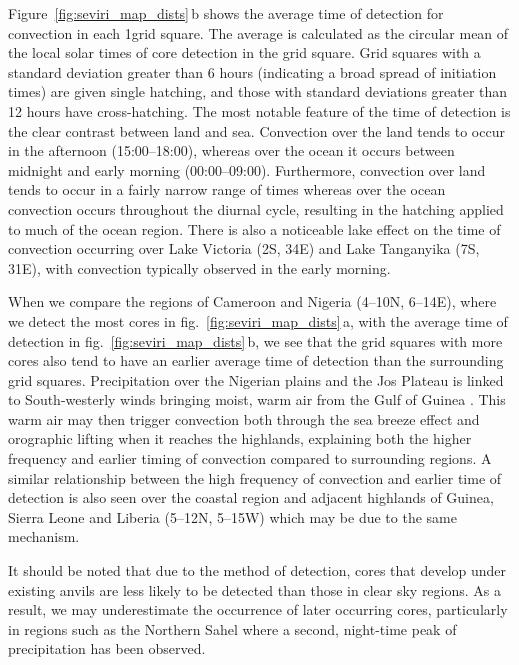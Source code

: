 \documentclass[acp, manuscript]{copernicus}
\begin{document}
Figure~\ref{fig:seviri_map_dists}\,b shows the average time of detection for convection in each 1\textdegree grid square. 
The average is calculated as the circular mean of the local solar times of core detection in the grid square. 
Grid squares with a standard deviation greater than 6 hours (indicating a broad spread of initiation times) are given single hatching, and those with standard deviations greater than 12 hours have cross-hatching. 
The most notable feature of the time of detection is the clear contrast between land and sea. 
Convection over the land tends to occur in the afternoon (15:00--18:00), whereas over the ocean it occurs between midnight and early morning (00:00--09:00). 
Furthermore, convection over land tends to occur in a fairly narrow range of times whereas over the ocean convection occurs throughout the diurnal cycle, resulting in the hatching applied to much of the ocean region. 
There is also a noticeable lake effect on the time of convection occurring over Lake Victoria (2\textdegree S, 34\textdegree E) and Lake Tanganyika (7\textdegree S, 31\textdegree E), with convection typically observed in the early morning.

When we compare the regions of Cameroon and Nigeria (4--10\textdegree N, 6--14\textdegree E), where we detect the most cores in fig.~\ref{fig:seviri_map_dists}\,a, with the average time of detection in fig.~\ref{fig:seviri_map_dists}\,b, we see that the grid squares with more cores also tend to have an earlier average time of detection than the surrounding grid squares. 
Precipitation over the Nigerian plains and the Jos Plateau is linked to South-westerly winds bringing moist, warm air from the Gulf of Guinea \citep{vondou_seasonal_2010}. 
This warm air may then trigger convection both through the sea breeze effect and orographic lifting when it reaches the highlands, explaining both the higher frequency and earlier timing of convection compared to surrounding regions. 
A similar relationship between the high frequency of convection and earlier time of detection is also seen over the coastal region and adjacent highlands of Guinea, Sierra Leone and Liberia (5--12\textdegree N, 5--15\textdegree W) which may be due to the same mechanism.

It should be noted that due to the method of detection, cores that develop under existing anvils are less likely to be detected than those in clear sky regions. 
As a result, we may underestimate the occurrence of later occurring cores, particularly in regions such as the Northern Sahel where a second, night-time peak of precipitation has been observed.
\end{document}

